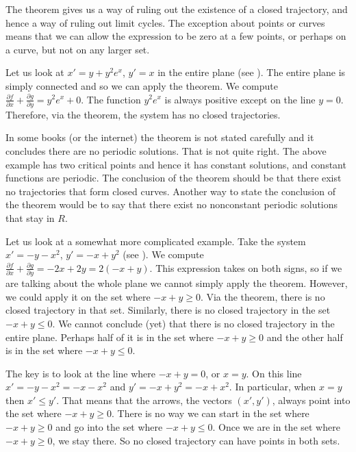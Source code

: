 The theorem gives us a way of ruling out the existence of a closed
trajectory, and hence a
way of ruling out limit cycles.
The exception about points or curves 
means that we can allow the expression to be zero at a few points,
or perhaps on a curve, but not on any larger set.

\begin{example}
Let us look at $x'=y+y^2e^x$, $y'=x$ in the entire plane (see
).
The entire plane
is simply connected and so we can apply the theorem.  We compute
$\frac{\partial f}{\partial x} + \frac{\partial g}{\partial y} =
y^2e^x+ 0$.  The function $y^2e^x$ is always positive except on the line
$y=0$.  Therefore, via the theorem, the system has no closed trajectories.
\end{example}

In some books (or the internet) the theorem is not stated carefully
and it concludes there are no periodic solutions.  That is not quite
right.  The above example has two critical points and hence it has
constant solutions, and constant functions are periodic.  The conclusion of
the theorem should be that there exist no trajectories that form closed
curves.  Another way to state the conclusion of the theorem would be to
say that there exist no nonconstant periodic solutions that stay in $R$.

\begin{example}
Let us look at a somewhat more complicated example.
Take the system $x'=-y-x^2$, $y'=-x+y^2$ (see
).  We compute
$\frac{\partial f}{\partial x} + \frac{\partial g}{\partial y} =
-2x + 2y=2(-x+y)$.  This expression takes on both signs, so if we are talking about the
whole plane we cannot simply apply the theorem.  However, we could apply it
on the set where $-x+y \geq 0$.  Via the theorem, there is no
closed trajectory in that set.  Similarly, there is no closed trajectory
in the set $-x+y \leq 0$.  We cannot conclude (yet) that there is no closed
trajectory in the entire plane.  Perhaps half of it is in the set where
$-x+y \geq 0$ and the other half is in the set where $-x+y \leq 0$.

The key is to look at the line where $-x+y=0$, or $x=y$.  On this line
$x' = -y-x^2 = -x-x^2$ and $y' = -x+y^2 = -x+x^2$.  In particular,
when $x=y$ then $x' \leq y'$.  That means that the arrows, the vectors
$(x',y')$, always point
into the set where $-x+y \geq 0$.  There is no way we can start in the
set where $-x+y \geq 0$
and go into the set where $-x+y \leq 0$.  Once we are in
the set where $-x+y \geq 0$, we stay there.  So no closed trajectory can
have points in both sets.
%
\end{example}


